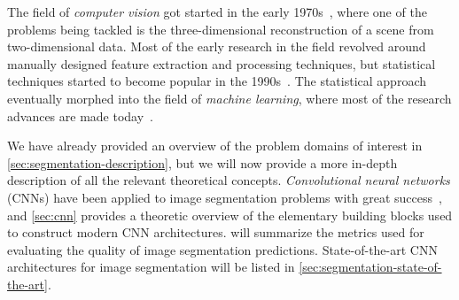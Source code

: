 The field of \textit{computer vision} got started in the early 1970s~\cite[p.~10]{computer_vision_history}, where one of the problems being tackled is the three-dimensional reconstruction of a scene from two-dimensional data.
Most of the early research in the field revolved around manually designed feature extraction and processing techniques, but statistical techniques started to become popular in the 1990s~\cite[p.~15]{computer_vision_history}.
The statistical approach eventually morphed into the field of \textit{machine learning}, where most of the research advances are made today~\cite[p.~17]{computer_vision_history}.

We have already provided an overview of the problem domains of interest in \cref{sec:segmentation-description}, but we will now provide a more in-depth description of all the relevant theoretical concepts.
\textit{Convolutional neural networks} (CNNs) have been applied to image segmentation problems with great success~\cite[p.~1]{image_recognition}, and \cref{sec:cnn} provides a theoretic overview of the elementary building blocks used to construct modern CNN architectures.
 will summarize the metrics used for evaluating the quality of image segmentation predictions.
State-of-the-art CNN architectures for image segmentation will be listed in \cref{sec:segmentation-state-of-the-art}.
